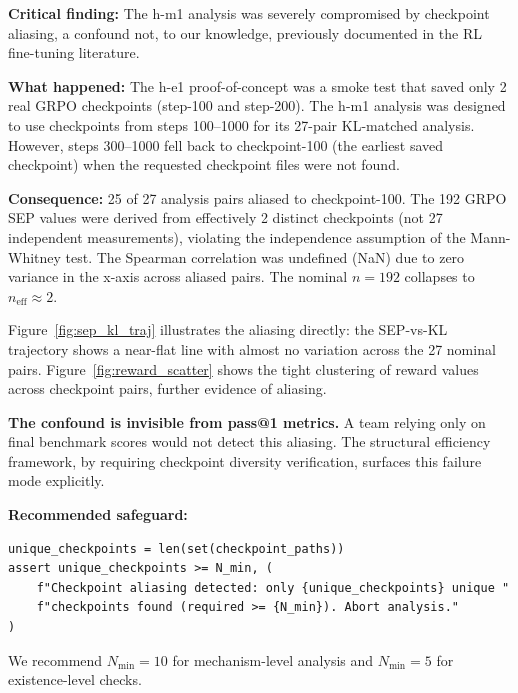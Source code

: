 \textbf{Critical finding:} The h-m1 analysis was severely compromised by checkpoint
aliasing, a confound not, to our knowledge, previously documented in the RL fine-tuning literature.

\textbf{What happened:} The h-e1 proof-of-concept was a smoke test that saved only
2 real GRPO checkpoints (step-100 and step-200). The h-m1 analysis was designed
to use checkpoints from steps 100--1000 for its 27-pair KL-matched analysis.
However, steps 300--1000 fell back to checkpoint-100 (the earliest saved
checkpoint) when the requested checkpoint files were not found.

\textbf{Consequence:} 25 of 27 analysis pairs aliased to checkpoint-100. The
192 GRPO SEP values were derived from effectively 2 distinct checkpoints
(not 27 independent measurements), violating the independence assumption of
the Mann-Whitney test. The Spearman correlation was undefined (NaN) due to
zero variance in the x-axis across aliased pairs. The nominal $n=192$ collapses
to $n_\text{eff} \approx 2$.

Figure~\ref{fig:sep_kl_traj} illustrates the aliasing directly: the
SEP-vs-KL trajectory shows a near-flat line with almost no variation across
the 27 nominal pairs. Figure~\ref{fig:reward_scatter} shows the tight clustering of reward values
across checkpoint pairs, further evidence of aliasing.

\textbf{The confound is invisible from pass@1 metrics.} A team relying only on
final benchmark scores would not detect this aliasing. The structural efficiency
framework, by requiring checkpoint diversity verification, surfaces this failure
mode explicitly.

\textbf{Recommended safeguard:}
\begin{verbatim}
unique_checkpoints = len(set(checkpoint_paths))
assert unique_checkpoints >= N_min, (
    f"Checkpoint aliasing detected: only {unique_checkpoints} unique "
    f"checkpoints found (required >= {N_min}). Abort analysis."
)
\end{verbatim}

We recommend $N_\text{min} = 10$ for mechanism-level analysis and $N_\text{min} = 5$
for existence-level checks.
